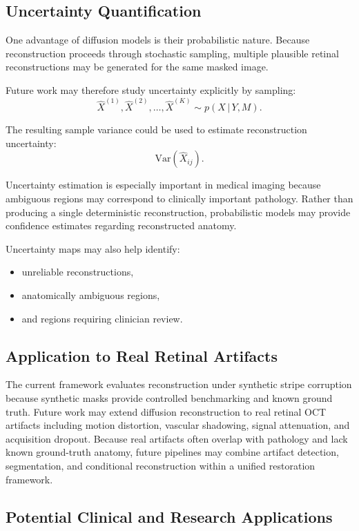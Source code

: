 \documentclass[12pt,oneside]{article}
\newcommand{\Var}{\mathrm{Var}}
\newcommand{\given}{\,|\,}
\begin{document}
\subsection{Uncertainty Quantification}

One advantage of diffusion models is their probabilistic nature. Because reconstruction proceeds through stochastic sampling, multiple plausible retinal reconstructions may be generated for the same masked image.

Future work may therefore study uncertainty explicitly by sampling:
\[
\hat{X}^{(1)},
\hat{X}^{(2)},
\ldots,
\hat{X}^{(K)}
\sim
p(X \given Y,M).
\]

The resulting sample variance could be used to estimate reconstruction uncertainty:
\[
\Var(\hat{X}_{ij}).
\]

Uncertainty estimation is especially important in medical imaging because ambiguous regions may correspond to clinically important pathology. Rather than producing a single deterministic reconstruction, probabilistic models may provide confidence estimates regarding reconstructed anatomy.

Uncertainty maps may also help identify:
\begin{itemize}
    \item unreliable reconstructions,
    \item anatomically ambiguous regions,
    \item and regions requiring clinician review.
\end{itemize}

\subsection{Application to Real Retinal Artifacts}

The current framework evaluates reconstruction under synthetic stripe corruption because synthetic masks provide controlled benchmarking and known ground truth. Future work may extend diffusion reconstruction to real retinal OCT artifacts including motion distortion, vascular shadowing, signal attenuation, and acquisition dropout. Because real artifacts often overlap with pathology and lack known ground-truth anatomy, future pipelines may combine artifact detection, segmentation, and conditional reconstruction within a unified restoration framework.

\subsection{Potential Clinical and Research Applications}
\end{document}
